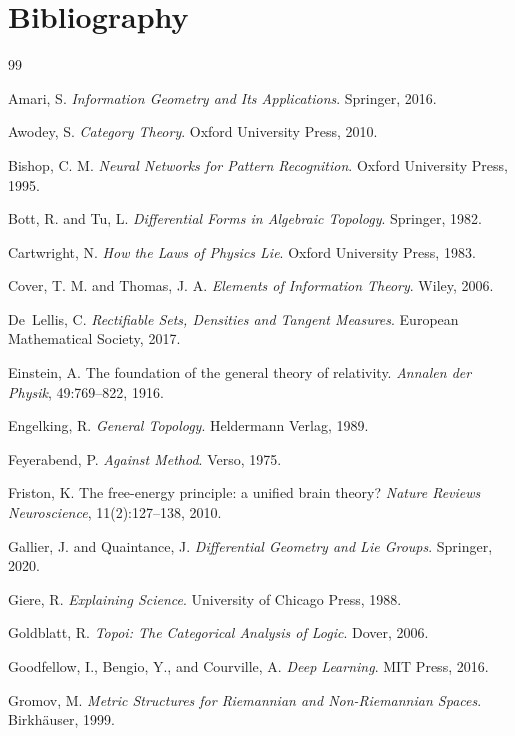\documentclass[12pt,oneside]{book}
\theoremstyle{plain}
\theoremstyle{definition}
\theoremstyle{remark}
\newcommand{\1}{\mathbf{1}}
\begin{document}
\chapter*{Bibliography}
\begin{thebibliography}{99}

Amari, S.
\textit{Information Geometry and Its Applications}.
Springer, 2016.

Awodey, S.
\textit{Category Theory}.
Oxford University Press, 2010.

Bishop, C. M.
\textit{Neural Networks for Pattern Recognition}.
Oxford University Press, 1995.

Bott, R. and Tu, L.
\textit{Differential Forms in Algebraic Topology}.
Springer, 1982.

Cartwright, N.
\textit{How the Laws of Physics Lie}.
Oxford University Press, 1983.

Cover, T. M. and Thomas, J. A.
\textit{Elements of Information Theory}.
Wiley, 2006.

De~Lellis, C.
\textit{Rectifiable Sets, Densities and Tangent Measures}.
European Mathematical Society, 2017.

Einstein, A.
The foundation of the general theory of relativity.
\textit{Annalen der Physik}, 49:769--822, 1916.

Engelking, R.
\textit{General Topology}.
Heldermann Verlag, 1989.

Feyerabend, P.
\textit{Against Method}.
Verso, 1975.

Friston, K.
The free-energy principle: a unified brain theory?
\textit{Nature Reviews Neuroscience}, 11(2):127--138, 2010.

Gallier, J. and Quaintance, J.
\textit{Differential Geometry and Lie Groups}.
Springer, 2020.

Giere, R.
\textit{Explaining Science}.
University of Chicago Press, 1988.

Goldblatt, R.
\textit{Topoi: The Categorical Analysis of Logic}.
Dover, 2006.

Goodfellow, I., Bengio, Y., and Courville, A.
\textit{Deep Learning}.
MIT Press, 2016.

Gromov, M.
\textit{Metric Structures for Riemannian and Non-Riemannian Spaces}.
Birkh\"{a}user, 1999.


\end{thebibliography}
\end{document}
